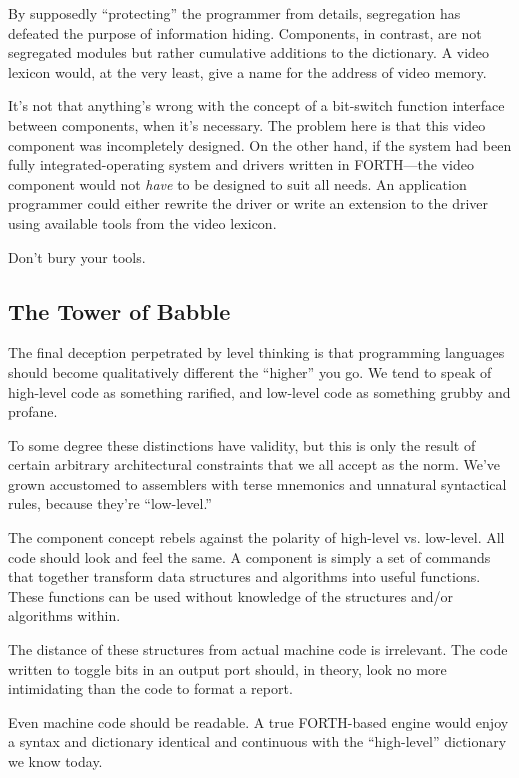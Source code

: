 By supposedly ``protecting'' the programmer from details, segregation
has defeated the purpose of information hiding. Components, in
contrast, are not segregated modules but rather cumulative additions
to the dictionary. A video lexicon would, at the very least, give a
name for the address of video memory.

It's not that anything's wrong with the concept of a bit-switch
function interface between components, when it's necessary. The
problem here is that this video component was incompletely
designed. On the other hand, if the system had been fully
integrated-operating system and drivers written in FORTH---the video
component would not \emph{have} to be designed to suit all needs. An
application programmer could either rewrite the driver or write an
extension to the driver using available tools from the video lexicon.

\pagebreak\begin{tip}
Don't bury your tools.
\end{tip}

\subsection{The Tower of Babble}

The final deception perpetrated by level thinking is that programming
languages should become qualitatively different the ``higher'' you go. We
tend to speak of high-level code as something rarified, and low-level code
as something grubby and profane.

To some degree these distinctions have validity, but this is only the
result of certain arbitrary architectural constraints that we all accept as
the norm. We've grown accustomed to assemblers with terse mnemonics
and unnatural syntactical rules, because they're ``low-level.''

The component concept rebels against the polarity of high-level vs.
low-level. All code should look and feel the same. A component is simply
a set of commands that together transform data structures and
algorithms into useful functions. These functions can be used without
knowledge of the structures and/or algorithms within.

The distance of these structures from actual machine code is
irrelevant. The code written to toggle bits in an output port should,
in theory, look no more intimidating than the code to format a report.

Even machine code should be readable. A true FORTH-based
engine would enjoy a syntax and dictionary identical and continuous
with the ``high-level'' dictionary we know today.

